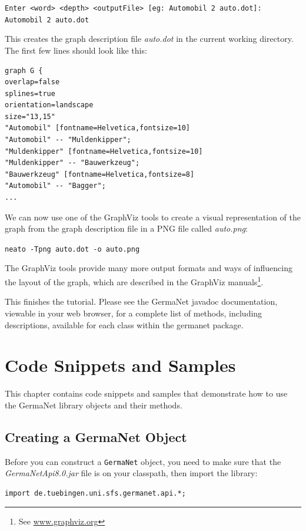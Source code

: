 \documentclass[12pt,a4paper,english,utf8]{report}
\begin{document}
\texttt{Enter <word> <depth> <outputFile> [eg: Automobil 2 auto.dot]:
Automobil 2 auto.dot}

This creates the graph description file \emph{auto.dot} in the current working directory. The first few lines should look like this:

\begin{lstlisting}
graph G {
overlap=false
splines=true
orientation=landscape
size="13,15"
"Automobil" [fontname=Helvetica,fontsize=10]
"Automobil" -- "Muldenkipper";
"Muldenkipper" [fontname=Helvetica,fontsize=10]
"Muldenkipper" -- "Bauwerkzeug";
"Bauwerkzeug" [fontname=Helvetica,fontsize=8]
"Automobil" -- "Bagger";
...
\end{lstlisting}

We can now use one of the GraphViz tools to create a visual representation of the graph from the graph description file in a PNG file called \emph{auto.png}:

\texttt{neato -Tpng auto.dot -o auto.png}

The GraphViz tools provide many more output formats and ways of influencing the layout of the graph, which are described in the GraphViz manuals\footnote{See \href{www.graphviz.org}{www.graphviz.org}}.

This finishes the tutorial. Please see the GermaNet javadoc documentation, viewable in your web browser, for a complete list of methods, including descriptions, available for each class within the germanet package.





\chapter{Code Snippets and Samples}
This chapter contains code snippets and samples that demonstrate how to use the GermaNet library objects and their methods.



\section{Creating a GermaNet Object}
\label{snippetsStart}
Before you can construct a \texttt{GermaNet} object, you need to make sure that the \emph{GermaNetApi8.0.jar} file is on your classpath, then import the library:

\begin{lstlisting}
import de.tuebingen.uni.sfs.germanet.api.*;
\end{lstlisting}
\end{document}
